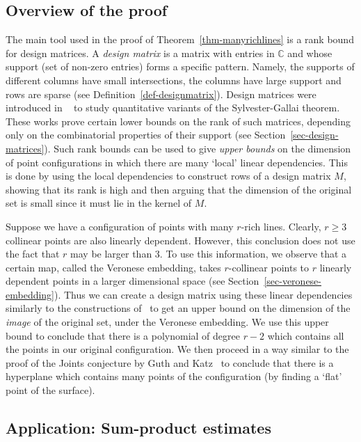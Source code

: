\documentclass[11pt]{article}
\def\C{{\mathbb{C}}}
\begin{document}
\subsection{Overview of the proof}
The main tool used in the proof of Theorem~\ref{thm-manyrichlines} is a rank bound for design matrices. A {\em design matrix} is a matrix with entries in $\C$ and whose support (set of non-zero entries) forms a specific pattern. Namely, the supports of different columns have small intersections, the columns have large support and rows are sparse (see Definition~\ref{def-designmatrix}). Design matrices were introduced in ~\cite{BDWY12,DSW12} to study quantitative variants of the Sylvester-Gallai theorem. These works prove  certain lower bounds on the rank of such matrices, depending only on the combinatorial properties of their support  (see Section~\ref{sec-design-matrices}). Such rank bounds can be used to give {\em upper bounds} on the dimension of point configurations in which there are many `local' linear dependencies. This is done by using the local dependencies to construct rows of a design matrix $M$, showing that its rank is  high and then arguing that the dimension of the original set is small since it must lie in the kernel of $M$.

Suppose we have a configuration of points with many $r$-rich lines. Clearly, $r \geq 3$ collinear points are also linearly dependent. However, this conclusion does not use the fact that $r$ may be larger than 3. To use this information, we observe that a certain map, called the Veronese embedding, takes $r$-collinear points to $r$ linearly dependent points in a larger dimensional space (see Section~\ref{sec-veronese-embedding}). Thus we can create a design matrix using these linear dependencies similarly to the constructions of~\cite{BDWY11,DSW12} to get an upper bound on the dimension of the {\em image} of the original set, under the Veronese embedding. We use this upper bound to conclude that there is a polynomial of degree $r-2$ which contains all the points in our original configuration. We then proceed in a way similar to the proof of the Joints conjecture by Guth and Katz~\cite{GK10b} to conclude that there is a hyperplane which contains many points of the configuration (by finding a `flat' point of the surface).




\subsection{Application: Sum-product estimates}
\end{document}
